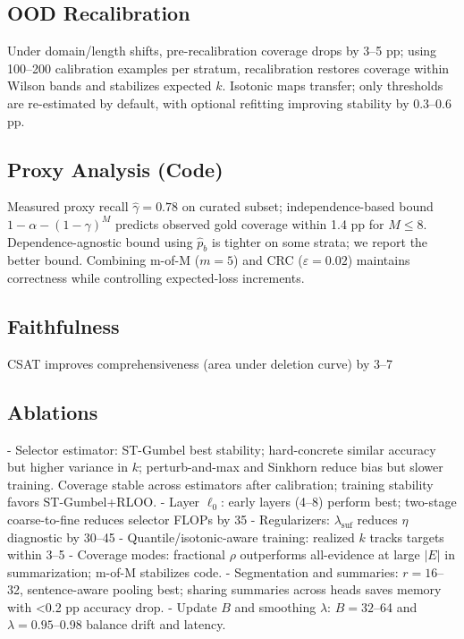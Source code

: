 \documentclass[11pt]{article}
\begin{document}
\subsection{OOD Recalibration}
Under domain/length shifts, pre-recalibration coverage drops by 3–5 pp; using 100–200 calibration examples per stratum, recalibration restores coverage within Wilson bands and stabilizes expected $k$. Isotonic maps transfer; only thresholds are re-estimated by default, with optional refitting improving stability by 0.3–0.6 pp.

\subsection{Proxy Analysis (Code)}
Measured proxy recall $\hat{\gamma}{=}0.78$ on curated subset; independence-based bound $1-\alpha-(1-\gamma)^M$ predicts observed gold coverage within 1.4 pp for $M{\le}8$. Dependence-agnostic bound using $\hat{p}_b$ is tighter on some strata; we report the better bound. Combining m-of-M ($m{=}5$) and CRC ($\varepsilon{=}0.02$) maintains correctness while controlling expected-loss increments.

\subsection{Faithfulness}
CSAT improves comprehensiveness (area under deletion curve) by 3–7%

\subsection{Ablations}
- Selector estimator: ST-Gumbel best stability; hard-concrete similar accuracy but higher variance in $k$; perturb-and-max and Sinkhorn reduce bias but slower training. Coverage stable across estimators after calibration; training stability favors ST-Gumbel+RLOO.
- Layer $\ell_0$: early layers (4–8) perform best; two-stage coarse-to-fine reduces selector FLOPs by 35%
- Regularizers: $\lambda_{\text{suf}}$ reduces $\eta$ diagnostic by 30–45%
- Quantile/isotonic-aware training: realized $k$ tracks targets within 3–5%
- Coverage modes: fractional $\rho$ outperforms all-evidence at large $|E|$ in summarization; m-of-M stabilizes code.
- Segmentation and summaries: $r{=}16$–32, sentence-aware pooling best; sharing summaries across heads saves memory with <0.2 pp accuracy drop.
- Update $B$ and smoothing $\lambda$: $B{=}32$–64 and $\lambda{=}0.95$–0.98 balance drift and latency.
\end{document}

